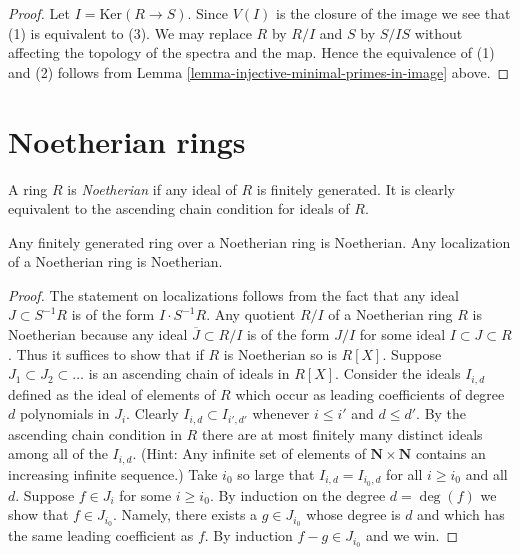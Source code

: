 \begin{proof}
Let $I = \text{Ker}(R \to S)$. Since $V(I)$ is the closure of the
image we see that (1) is equivalent to (3). We may replace
$R$ by $R/I$ and $S$ by $S/IS$ without affecting the topology
of the spectra and the map. Hence the equivalence of (1) and (2)
follows from Lemma \ref{lemma-injective-minimal-primes-in-image} above.
\end{proof}








\section{Noetherian rings}
\label{section-Noetherian}

\noindent
A ring $R$ is {\it Noetherian} if any ideal of $R$ is
finitely generated. It is clearly equivalent to the
ascending chain condition for ideals of $R$.

\begin{lemma}
\label{lemma-Noetherian-permanence}
Any finitely generated ring over a Noetherian ring
is Noetherian. Any localization of a Noetherian ring
is Noetherian.
\end{lemma}

\begin{proof}
The statement on localizations follows from the fact
that any ideal $J \subset S^{-1}R$ is of the form
$I \cdot S^{-1}R$. Any quotient $R/I$ of a Noetherian
ring $R$ is Noetherian because any ideal $\overline{J} \subset R/I$
is of the form $J/I$ for some ideal $I \subset J \subset R$.
Thus it suffices to show that if $R$ is Noetherian so
is $R[X]$. Suppose $J_1 \subset J_2 \subset \ldots$ is an
ascending chain of ideals in $R[X]$. Consider the ideals $I_{i,d}$
defined as the ideal of elements of $R$ which occur as leading
coefficients of degree $d$ polynomials in $J_i$.
Clearly $I_{i, d} \subset I_{i', d'}$ whenever
$i \leq i'$ and $d \leq d'$. By the ascending chain condition
in $R$ there are at most finitely many distinct ideals among all of
the $I_{i,d}$.
(Hint: Any infinite set of elements of
$\mathbf{N} \times \mathbf{N}$ contains an increasing
infinite sequence.)
Take $i_0$ so large that $I_{i, d} = I_{i_0, d}$
for all $i \geq i_0$ and all $d$. Suppose $f \in J_i$ for some $i \geq i_0$.
By induction on the degree $d = \deg(f)$ we show that $f \in J_{i_0}$.
Namely, there exists a $g\in J_{i_0}$ whose degree is $d$ and which
has the same leading coefficient as $f$. By induction
$f - g \in J_{i_0}$ and we win.
\end{proof}

